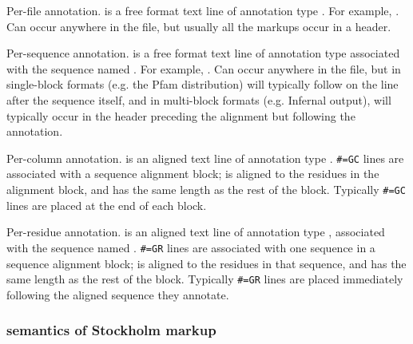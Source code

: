 \begin{sreitems}{}
\item [\emprog{\#=GF <tag> <s>}]
        Per-file annotation.  is a free format text line
        of annotation type . For example, . Can occur anywhere in the file, but usually
        all the  markups occur in a header.

\item [\emprog{\#=GS <seqname> <tag> <s>}]
        Per-sequence annotation.  is a free format text line
        of annotation type  associated with the sequence
        named . For example, . Can occur anywhere
        in the file, but in single-block formats (e.g. the Pfam
        distribution) will typically follow on the line after the
        sequence itself, and in multi-block formats (e.g. Infernal
        output), will typically occur in the header preceding the
        alignment but following the  annotation.

\item [\emprog{\#=GC <tag> <..s..>}]
        Per-column annotation.  is an aligned text line
        of annotation type .
        \verb+#=GC+ lines are
        associated with a sequence alignment block; 
        is aligned to the residues in the alignment block, and has
        the same length as the rest of the block.
        Typically \verb+#=GC+ lines are placed at the end of each block.

\item [\emprog{\#=GR <seqname> <tag> <..s..>}]
        Per-residue annotation.  is an aligned text line
        of annotation type , associated with the sequence
        named . 
        \verb+#=GR+ lines are 
        associated with one sequence in a sequence alignment block; 
        is aligned to the residues in that sequence, and has
        the same length as the rest of the block.
        Typically
        \verb+#=GR+ lines are placed immediately following the
        aligned sequence they annotate.
\end{sreitems}

\subsubsection{semantics of Stockholm markup}

